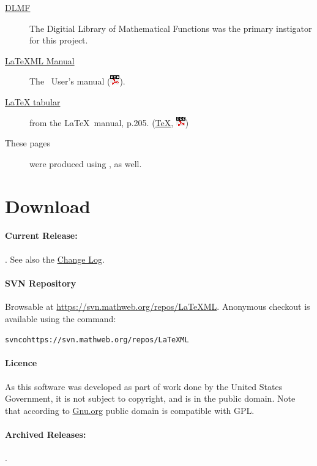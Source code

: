 \documentclass{article}
\newcommand{\PDFIcon}{\includegraphics{pdf}}
\begin{document}
\begin{description}
\item[\href{http://dlmf.nist.gov/contents/}{DLMF}]
   The Digitial Library of Mathematical Functions was the
   primary instigator for this project.
\item[\href{manual/}{LaTeXML Manual}]
   The \LaTeXML\ User's manual (\href{manual.pdf}{\PDFIcon}).
\item[\href{examples/tabular/tabular.html}{LaTeX tabular}]
    from the \LaTeX\ manual, p.205.
    (\href{examples/tabular/tabular.tex}{\TeX},
     \href{examples/tabular/tabular.pdf}{\PDFIcon})
\item[These pages] were produced using \LaTeXML, as well.
\end{description}

\section{Download}\label{download}
\paragraph{Current Release:}
\CurrentRelease.
See also the \href{Changes}{Change Log}.

\paragraph{SVN Repository}
Browsable at \url{https://svn.mathweb.org/repos/LaTeXML}.
Anonymous checkout is available using the command:
\begin{alltt}
  svn co https://svn.mathweb.org/repos/LaTeXML
\end{alltt}

\paragraph{Licence}
As this software was developed as part of work done by the
United States Government, it is not subject to copyright,
and is in the public domain.
Note that according to
\href{http://www.gnu.org/licences/license-list.html#PublicDomain}{Gnu.org}
public domain is compatible with GPL.

\paragraph{Archived Releases:}
\PreviousReleases.

\end{document}
